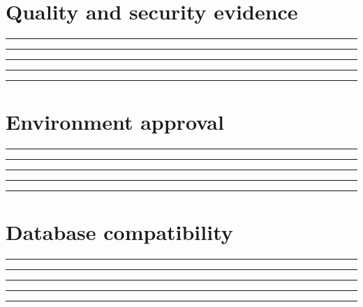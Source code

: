 \documentclass[11pt,letterpaper]{article}
\begin{document}
\section{Quality and security evidence}
\vspace{2mm}
\noindent\rule{0.93\linewidth}{0.4pt}\par\vspace{13pt}
\noindent\rule{0.93\linewidth}{0.4pt}\par\vspace{13pt}
\noindent\rule{0.93\linewidth}{0.4pt}\par\vspace{13pt}
\noindent\rule{0.93\linewidth}{0.4pt}\par\vspace{13pt}
\noindent\rule{0.93\linewidth}{0.4pt}\par\vspace{13pt}
\section{Environment approval}
\vspace{2mm}
\noindent\rule{0.93\linewidth}{0.4pt}\par\vspace{13pt}
\noindent\rule{0.93\linewidth}{0.4pt}\par\vspace{13pt}
\noindent\rule{0.93\linewidth}{0.4pt}\par\vspace{13pt}
\noindent\rule{0.93\linewidth}{0.4pt}\par\vspace{13pt}
\noindent\rule{0.93\linewidth}{0.4pt}\par\vspace{13pt}
\section{Database compatibility}
\vspace{2mm}
\noindent\rule{0.93\linewidth}{0.4pt}\par\vspace{13pt}
\noindent\rule{0.93\linewidth}{0.4pt}\par\vspace{13pt}
\noindent\rule{0.93\linewidth}{0.4pt}\par\vspace{13pt}
\noindent\rule{0.93\linewidth}{0.4pt}\par\vspace{13pt}
\noindent\rule{0.93\linewidth}{0.4pt}\par\vspace{13pt}
\end{document}
